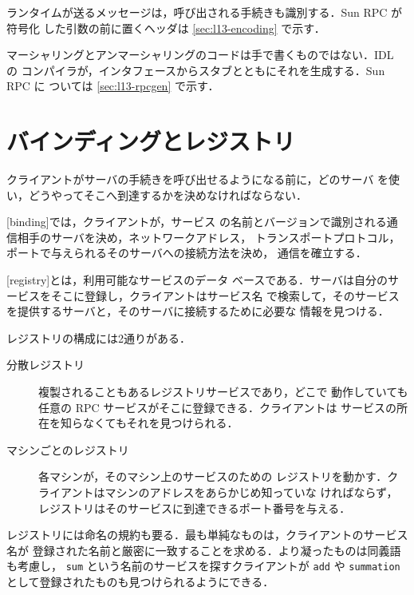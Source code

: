 \documentclass[../main.tex]{subfiles}
\begin{document}
ランタイムが送るメッセージは，呼び出される手続きも識別する．Sun RPC が符号化
した引数の前に置くヘッダは \cref{sec:l13-encoding} で示す．

マーシャリングとアンマーシャリングのコードは手で書くものではない．IDL の
コンパイラが，インタフェースからスタブとともにそれを生成する．Sun RPC に
ついては \cref{sec:l13-rpcgen} で示す．

\section{バインディングとレジストリ}
\label{sec:l13-binding}

クライアントがサーバの手続きを呼び出せるようになる前に，どのサーバ
を使い，どうやってそこへ到達するかを決めなければならない．

\begin{definition}[バインディング]
  [binding]では，クライアントが，サービス
  の名前とバージョンで識別される通信相手のサーバを決め，ネットワークアドレス，
  トランスポートプロトコル，ポートで与えられるそのサーバへの接続方法を決め，
  通信を確立する．
\end{definition}

\begin{definition}[レジストリ]
  [registry]とは，利用可能なサービスのデータ
  ベースである．サーバは自分のサービスをそこに登録し，クライアントはサービス名
  で検索して，そのサービスを提供するサーバと，そのサーバに接続するために必要な
  情報を見つける．
\end{definition}

レジストリの構成には2通りがある．
\begin{description}
  \item[分散レジストリ] 複製されることもあるレジストリサービスであり，どこで
    動作していても任意の RPC サービスがそこに登録できる．クライアントは
    サービスの所在を知らなくてもそれを見つけられる．
  \item[マシンごとのレジストリ] 各マシンが，そのマシン上のサービスのための
    レジストリを動かす．クライアントはマシンのアドレスをあらかじめ知っていな
    ければならず，レジストリはそのサービスに到達できるポート番号を与える．
\end{description}
レジストリには命名の規約も要る．最も単純なものは，クライアントのサービス名が
登録された名前と厳密に一致することを求める．より凝ったものは同義語も考慮し，
\texttt{sum} という名前のサービスを探すクライアントが \texttt{add} や
\texttt{summation} として登録されたものも見つけられるようにできる．
\end{document}
